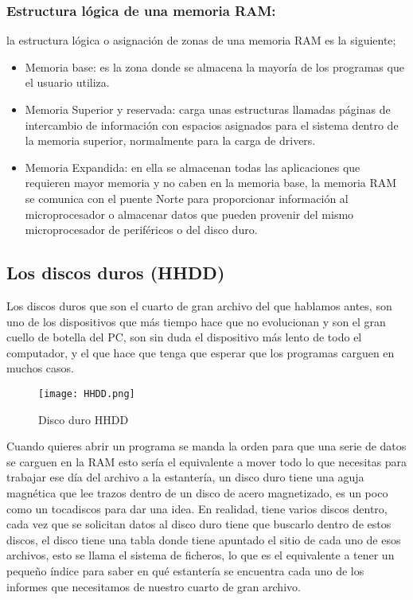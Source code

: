 \documentclass{article}
\begin{document}
\subsubsection{Estructura lógica de una memoria RAM:}
la estructura lógica o asignación de zonas de una memoria RAM es la siguiente;

\begin{itemize}
    \item Memoria base: es la zona donde se almacena la mayoría de los programas que el usuario utiliza.
    \item Memoria Superior y reservada: carga unas estructuras llamadas páginas de intercambio de información con espacios asignados para el sistema dentro de la memoria superior, normalmente para la carga de drivers.
    \item Memoria Expandida: en ella se almacenan todas las aplicaciones que requieren mayor memoria y no caben en la memoria base, la memoria RAM se comunica con el puente Norte para proporcionar información al microprocesador o almacenar datos que pueden provenir del mismo microprocesador de periféricos o del disco duro.
\end{itemize}

\subsection{Los discos duros (HHDD)}

Los discos duros que son el cuarto de gran archivo del que hablamos antes, son uno de los dispositivos que más tiempo hace que no evolucionan y son el gran cuello de botella del PC, son sin duda el dispositivo más lento de todo el computador, y el que hace que tenga que esperar que los programas carguen en muchos casos.\\


\begin{figure}[h]
\texttt{[image: HHDD.png]}
\centering
\caption{Disco duro HHDD}
\label{fig:Disco duro HHDD}
\end{figure}


Cuando quieres abrir un programa se manda la orden para que una serie de datos se carguen en la RAM esto sería el equivalente a mover todo lo que necesitas para trabajar ese día del archivo a la estantería, un disco duro tiene una aguja magnética que lee trazos dentro de un disco de acero magnetizado, es un poco como un tocadiscos para dar una idea. En realidad, tiene varios discos dentro, cada vez que se solicitan datos al disco duro tiene que buscarlo dentro de estos discos, el disco tiene una tabla donde tiene apuntado el sitio de cada uno de esos archivos, esto se llama el sistema de ficheros, lo que es el equivalente a tener un pequeño índice para saber en qué estantería se encuentra cada uno de los informes que necesitamos de nuestro cuarto de gran archivo.\\ 
\end{document}
